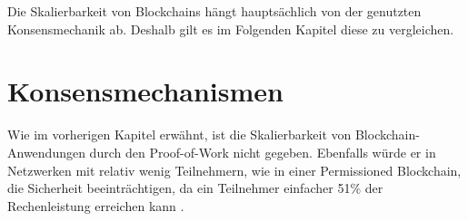 

Die Skalierbarkeit von Blockchains hängt hauptsächlich von der genutzten Konsensmechanik ab. Deshalb gilt es im Folgenden Kapitel diese zu vergleichen.

\label{subsec:eval-konsens}
\section{Konsensmechanismen}
Wie im vorherigen Kapitel erwähnt, ist die Skalierbarkeit von Blockchain-Anwendungen durch den Proof-of-Work nicht gegeben. Ebenfalls würde er in Netzwerken mit relativ wenig Teilnehmern, wie in einer Permissioned Blockchain, die Sicherheit beeinträchtigen, da ein Teilnehmer einfacher 51\% der Rechenleistung erreichen kann \cite{Gramolidangerprivateblockchains2016}.

\cite{Consensus}

